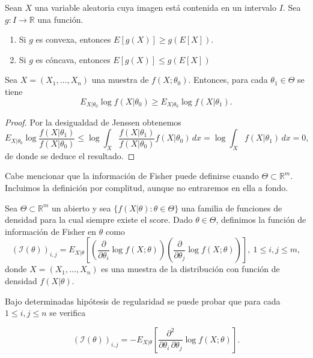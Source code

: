 \documentclass{article}
\begin{document}
    \begin{lem}
        Sean $X$ una variable aleatoria cuya imagen está contenida en un intervalo $I$. Sea $g: I \to \mathbb{R}$ una función.
        \begin{enumerate}
            \item Si $g$ es convexa, entonces $E[g(X)] \ge g(E[X])$.
            \item Si $g$ es cóncava, entonces $E[g(X)] \le g(E[X])$
        \end{enumerate}
    \end{lem}

    \begin{prop} \label{prop:desigualdad}
        Sea $X = (X_1, \ldots, X_n)$ una muestra de $f(X;\theta_0)$. Entonces, para cada $\theta_1 \in \Theta$ se tiene
        \[E_{X|\theta_0} \log f(X|\theta_0) \ge E_{X|\theta_0} \log f(X|\theta_1).\]
    \end{prop}
    \begin{proof}
        Por la desigualdad de Jenssen obtenemos
        \[E_{X|\theta_0} \log \frac{f(X|\theta_1)}{f(X|\theta_0)} \le \log \int_X \frac{f(X|\theta_1)}{f(X|\theta_0)} f(X|\theta_0) \, dx = \log \int_X f(X|\theta_1) \, dx = 0,\]
        de donde se deduce el resultado.
    \end{proof}

    Cabe mencionar que la información de Fisher puede definirse cuando $\Theta \subset \mathbb{R}^m$. Incluimos la definición por complitud, aunque no entraremos en ella a fondo.

    \begin{definition}
        Sea $\Theta \subset \mathbb{R}^m$ un abierto y sea $\{f(X|\theta): \theta \in \Theta\}$ una familia de funciones de densidad para la cual siempre existe el score. Dado $\theta \in \Theta$, definimos la función de información de Fisher en $\theta$ como
        \[{\left(\mathcal{I} \left(\theta \right) \right)}_{i, j} = E_{X|\theta} \left[
          \left(\frac{\partial}{\partial\theta_i} \log f(X;\theta)\right)
          \left(\frac{\partial}{\partial\theta_j} \log f(X;\theta)\right)\right], \ 1 \le i,j \le m,\]
        donde $X = (X_1, \ldots, X_n)$ es una muestra de la distribución con función de densidad $f(X|\theta)$.
    \end{definition}

    Bajo determinadas hipótesis de regularidad se puede probar que para cada $1 \le i, j \le n$ se verifica

    \[{\left(\mathcal{I} \left(\theta \right) \right)}_{i, j} =
      -E_{X|\theta}\left[\frac{\partial^2}{\partial\theta_i \, \partial\theta_j} \log f(X;\theta)
    \right].\]
\end{document}
